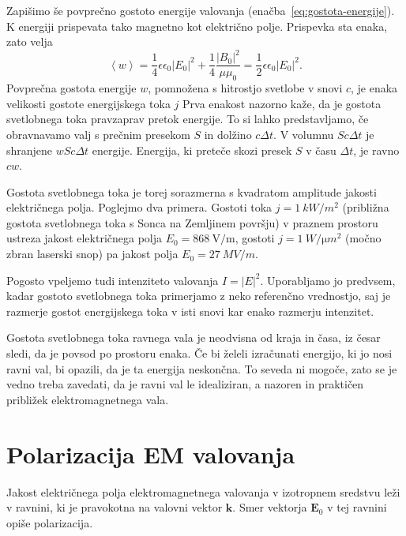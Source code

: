 Zapišimo še povprečno gostoto energije valovanja (enačba~\ref{eq:gostota-energije}). 
K energiji prispevata tako magnetno kot električno polje. Prispevka sta enaka, zato velja
\begin{equation}
\left\langle w\right\rangle =\frac{1}{4}\epsilon\epsilon_{0}\left|E_{0}\right|^{2}+
\frac{1}{4}\frac{\left|B_{0}\right|^{2}}{\mu\mu_{0}}=\frac{1}{2}\epsilon\epsilon_{0}\left|E_{0}\right|^{2}.
\end{equation}
Povprečna gostota energije $w$, pomnožena s hitrostjo svetlobe v
snovi $c$, je enaka velikosti gostote energijskega toka $j$
Prva enakost nazorno kaže, da je gostota svetlobnega toka pravzaprav pretok
energije. To si lahko predstavljamo, če obravnavamo valj s prečnim presekom
$S$ in dolžino $c\Delta t$. V volumnu $Sc\Delta t$ je shranjene $wSc\Delta t$
energije. Energija, ki preteče skozi presek $S$ v času $\Delta t$,
je ravno $cw$. 

Gostota svetlobnega toka je torej sorazmerna
s kvadratom amplitude jakosti električnega polja. Poglejmo dva primera.
Gostoti toka $j=1~\si{kW/m^{2}}$
(približna gostota svetlobnega toka s Sonca na Zemljinem površju) v praznem prostoru ustreza 
jakost električnega polja $E_{0}=868~\si{\volt/\meter}$, gostoti $j=1~\si{W/\micro m^{2}}$ 
(močno zbran laserski snop) pa jakost polja $E_{0}=27~\si{MV/m}$. 

Pogosto vpeljemo tudi intenziteto valovanja $I= |E|^2$. Uporabljamo jo 
predvsem, kadar gostoto svetlobnega toka primerjamo z neko referenčno vrednostjo, 
saj je razmerje gostot energijskega toka v isti snovi kar enako razmerju intenzitet.

Gostota svetlobnega toka ravnega vala je neodvisna od kraja in časa, iz česar sledi,
da je povsod po prostoru enaka. Če bi želeli izračunati energijo,
ki jo nosi ravni val, bi opazili, da je ta energija neskončna. To
seveda ni mogoče, zato se je vedno treba zavedati, da je ravni val
le idealiziran, a nazoren in praktičen približek elektromagnetnega
vala.

\section{Polarizacija EM valovanja}
Jakost električnega polja elektromagnetnega valovanja v izotropnem
sredstvu leži v ravnini, ki je pravokotna na valovni vektor $\mathbf{k}$. 
Smer vektorja $\mathbf{E}_0$ v tej ravnini opiše
polarizacija. 

